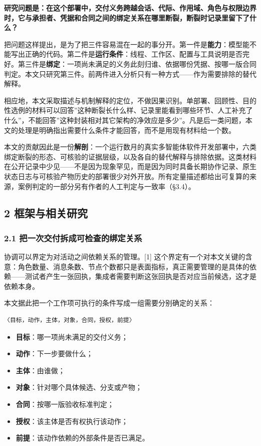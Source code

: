 \documentclass[
]{article}
\providecommand{\tightlist}{%
  \setlength{\itemsep}{0pt}\setlength{\parskip}{0pt}}
\begin{document}
\textbf{研究问题是：在这个部署中，交付义务跨越会话、代际、作用域、角色与权限边界时，它与承担者、凭据和合同之间的绑定关系在哪里断裂，断裂时记录里留下了什么？}

把问题这样提出，是为了把三件容易混在一起的事分开。第一件是\textbf{能力}：模型能不能写出正确的代码。第二件是\textbf{运行条件}：线程、工作区、配置与工具说明是否完好。第三件是\textbf{绑定}：一项尚未满足的义务此刻归谁、依据哪份凭据、按哪一版合同判定。本文只研究第三件。前两件进入分析只有一种方式------作为需要排除的替代解释。

相应地，本文采取描述与机制解释的定位，不做因果识别。单部署、回顾性、目的性选例的材料可以回答''这种断裂长什么样、记录里能看到哪些环节、人工补充了什么''，不能回答''这种封装相对其它架构的净效应是多少''。凡是后一类问题，本文的处理是明确指出需要什么条件才能回答，而不是用现有材料给一个数。

本文的贡献因此是一份\textbf{解剖}：一个运行数月的真实多智能体软件开发部署中，六类绑定断裂的形态、可核验的证据层级，以及各自的替代解释与排除依据。这类材料在公开记录中少见------不是因为现象罕见，而是因为同时具备长期协作记录、原生状态日志与可核验产物历史的部署很少对外开放。所有定量描述都给出可复算的来源，案例判定的一部分另有作者的人工判定与一致率（§3.4）。

\subsection{2
框架与相关研究}\label{ux6846ux67b6ux4e0eux76f8ux5173ux7814ux7a76}

\subsubsection{2.1
把一次交付拆成可检查的绑定关系}\label{ux628aux4e00ux6b21ux4ea4ux4ed8ux62c6ux6210ux53efux68c0ux67e5ux7684ux7ed1ux5b9aux5173ux7cfb}

协调可以界定为对活动之间依赖关系的管理。{[}1{]}
这个界定有一个对本文关键的含意：角色数量、消息条数、节点个数都只是表面指标，真正需要管理的是具体的依赖------测试者产生一张回执，集成者需要判断这张回执是否对应当前候选，这才是依赖本身。

本文据此把一个工作项可执行的条件写成一组需要分别确定的关系：

\begin{verbatim}
〈目标，动作，主体，对象，合同，授权，前提〉
\end{verbatim}

\begin{itemize}
\tightlist
\item
  \textbf{目标}：哪一项尚未满足的交付义务；
\item
  \textbf{动作}：下一步要做什么；
\item
  \textbf{主体}：由谁做；
\item
  \textbf{对象}：针对哪个具体候选、分支或产物；
\item
  \textbf{合同}：按哪一版验收标准判定；
\item
  \textbf{授权}：该主体是否有权执行该动作；
\item
  \textbf{前提}：该动作依赖的外部条件是否已满足。
\end{itemize}
\end{document}
